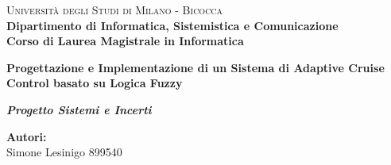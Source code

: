 \begin{titlepage}
    
    \noindent
    \begin{minipage}[t]{0.19\textwidth}
    \end{minipage}
    \hspace{2mm}
    \vspace{3cm}
    \begin{minipage}[t]{0.95\textwidth}
    {
            {\textsc{Università degli Studi di Milano - Bicocca}} \\
            \textbf{Dipartimento di Informatica, Sistemistica e Comunicazione} \\
            \textbf{Corso di Laurea Magistrale in Informatica} \\
            \par
    }
    \end{minipage}
    
\vspace{16mm}

\begin{center}
    \Huge{
        \textbf{Progettazione e Implementazione di un Sistema di Adaptive Cruise Control basato su Logica Fuzzy}                           
    }

    \vspace{12mm}
    
    \LARGE{
        \textbf{
            \textit{Progetto Sistemi e Incerti}
        }
    }
\end{center}
 
    \vspace{30mm}

    \noindent
    
    \vspace{10mm}

    \begin{flushright}
        {\large \textbf{Autori:}} \\
        \large{Simone Lesinigo 899540} 
    \end{flushright}

    
\end{titlepage}